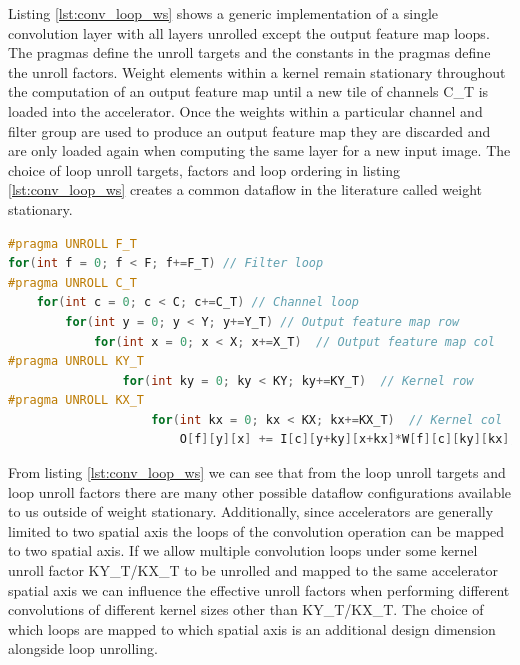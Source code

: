 Listing \ref{lst:conv_loop_ws} shows a generic
implementation of a single convolution layer with all layers unrolled except the
output feature map loops. The pragmas define the unroll
targets and the constants in the pragmas define the unroll factors. 
Weight elements within a
kernel remain stationary throughout the computation of an output feature map
until a new tile of channels C\_T is loaded into the accelerator. Once the
weights within a particular channel and filter group are used to produce an
output feature map they are discarded and are only loaded again when computing
the same layer for a new input image. The choice of loop unroll targets, factors
and loop ordering in listing \ref{lst:conv_loop_ws} creates a common dataflow in
the literature called weight stationary.

\begin{minipage}{\linewidth}
    \begin{lstlisting}[language=C, caption=Convolution implemented as nested loops, label={lst:conv_loop_ws}]
#pragma UNROLL F_T
for(int f = 0; f < F; f+=F_T) // Filter loop
#pragma UNROLL C_T
    for(int c = 0; c < C; c+=C_T) // Channel loop
        for(int y = 0; y < Y; y+=Y_T) // Output feature map row
            for(int x = 0; x < X; x+=X_T)  // Output feature map col
#pragma UNROLL KY_T
                for(int ky = 0; ky < KY; ky+=KY_T)  // Kernel row
#pragma UNROLL KX_T
                    for(int kx = 0; kx < KX; kx+=KX_T)  // Kernel col
                        O[f][y][x] += I[c][y+ky][x+kx]*W[f][c][ky][kx];
    \end{lstlisting}
\end{minipage}
 

From listing \ref{lst:conv_loop_ws} we
can see that from the loop unroll targets and loop unroll factors there are many
other possible dataflow configurations available to us outside of weight
stationary. Additionally, since accelerators are generally limited to two
spatial axis the loops of the convolution operation can be mapped to two spatial
axis. If we allow multiple convolution loops under some kernel unroll factor
KY\_T/KX\_T  to be unrolled and mapped to the same accelerator spatial axis we
can influence the effective unroll factors when performing different
convolutions of different kernel sizes other than KY\_T/KX\_T. The choice of
which loops are mapped to which spatial axis is an additional design dimension
alongside loop unrolling. 


